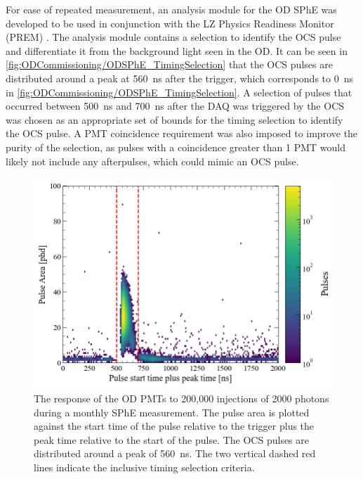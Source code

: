 For ease of repeated measurement, an analysis module for the OD SPhE was developed to be used in conjunction with the LZ Physics Readiness Monitor (PREM) \cite{LZTDR}. The analysis module contains a selection to identify the OCS pulse and differentiate it from the background light seen in the OD. It can be seen in \autoref{fig:ODCommissioning/ODSPhE_TimingSelection} that the OCS pulses are distributed around a peak at 560~ns after the trigger, which corresponds to 0~ns in \autoref{fig:ODCommissioning/ODSPhE_TimingSelection}. A selection of pulses that occurred between 500~ns and 700~ns after the DAQ was triggered by the OCS was chosen as an appropriate set of bounds for the timing selection to identify the OCS pulse. A PMT coincidence requirement was also imposed to improve the purity of the selection, as pulses with a coincidence greater than 1 PMT would likely not include any afterpulses, which could mimic an OCS pulse.

\begin{figure}[ht!]
    \centering
    \includegraphics[width=0.7\linewidth]{figures/ODCommissioning/TimingVsPulseArea_2us.png}
    \caption[The response of the OD PMTs to 200,000 injections of 2000 photons during a monthly SPhE measurement.]{The response of the OD PMTs to 200,000 injections of 2000 photons during a monthly SPhE measurement. The pulse area is plotted against the start time of the pulse relative to the trigger plus the peak time relative to the start of the pulse. The OCS pulses are distributed around a peak of 560~ns. The two vertical dashed red lines indicate the inclusive timing selection criteria.}
    \label{fig:ODCommissioning/ODSPhE_TimingSelection}
\end{figure}


